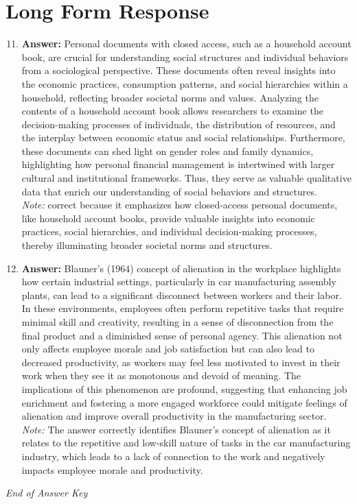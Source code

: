 \documentclass[12pt]{article}
\begin{document}
\section*{Long Form Response}
\begin{enumerate}[label=\arabic*.]
\setcounter{enumi}{10}
\item \textbf{Answer:} Personal documents with closed access, such as a household account book, are crucial for understanding social structures and individual behaviors from a sociological perspective. These documents often reveal insights into the economic practices, consumption patterns, and social hierarchies within a household, reflecting broader societal norms and values. Analyzing the contents of a household account book allows researchers to examine the decision-making processes of individuals, the distribution of resources, and the interplay between economic status and social relationships. Furthermore, these documents can shed light on gender roles and family dynamics, highlighting how personal financial management is intertwined with larger cultural and institutional frameworks. Thus, they serve as valuable qualitative data that enrich our understanding of social behaviors and structures.
\\ \textit{Note:} correct because it emphasizes how closed-access personal documents, like household account books, provide valuable insights into economic practices, social hierarchies, and individual decision-making processes, thereby illuminating broader societal norms and structures.
\item \textbf{Answer:} Blauner's (1964) concept of alienation in the workplace highlights how certain industrial settings, particularly in car manufacturing assembly plants, can lead to a significant disconnect between workers and their labor. In these environments, employees often perform repetitive tasks that require minimal skill and creativity, resulting in a sense of disconnection from the final product and a diminished sense of personal agency. This alienation not only affects employee morale and job satisfaction but can also lead to decreased productivity, as workers may feel less motivated to invest in their work when they see it as monotonous and devoid of meaning. The implications of this phenomenon are profound, suggesting that enhancing job enrichment and fostering a more engaged workforce could mitigate feelings of alienation and improve overall productivity in the manufacturing sector.
\\ \textit{Note:} The answer correctly identifies Blauner's concept of alienation as it relates to the repetitive and low-skill nature of tasks in the car manufacturing industry, which leads to a lack of connection to the work and negatively impacts employee morale and productivity.
\end{enumerate}

\vfill
\noindent\textit{End of Answer Key}
\end{document}
